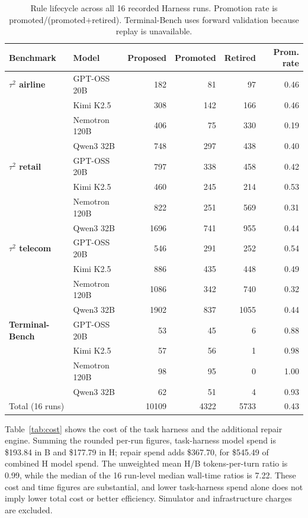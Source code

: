 \documentclass[11pt,letterpaper]{article}
\begin{document}
\begin{table}[H]
\centering\small
\setlength{\tabcolsep}{3pt}
\caption{Rule lifecycle across all 16 recorded Harness runs.
Promotion rate is promoted/(promoted$+$retired). Terminal-Bench uses
forward validation because replay is unavailable.}
\label{tab:lifecycle}
\begin{tabular*}{\linewidth}{@{\extracolsep{\fill}}llrrrr@{}}
\toprule
Benchmark & Model & Proposed & Promoted & Retired & Prom. rate \\
\midrule
\textbf{$\tau^2$ airline} & GPT-OSS 20B & 182 & 81 & 97 & 0.46 \\
 & Kimi K2.5 & 308 & 142 & 166 & 0.46 \\
 & Nemotron 120B & 406 & 75 & 330 & 0.19 \\
 & Qwen3 32B & 748 & 297 & 438 & 0.40 \\
\midrule
\textbf{$\tau^2$ retail} & GPT-OSS 20B & 797 & 338 & 458 & 0.42 \\
 & Kimi K2.5 & 460 & 245 & 214 & 0.53 \\
 & Nemotron 120B & 822 & 251 & 569 & 0.31 \\
 & Qwen3 32B & 1696 & 741 & 955 & 0.44 \\
\midrule
\textbf{$\tau^2$ telecom} & GPT-OSS 20B & 546 & 291 & 252 & 0.54 \\
 & Kimi K2.5 & 886 & 435 & 448 & 0.49 \\
 & Nemotron 120B & 1086 & 342 & 740 & 0.32 \\
 & Qwen3 32B & 1902 & 837 & 1055 & 0.44 \\
\midrule
\textbf{Terminal-Bench} & GPT-OSS 20B & 53 & 45 & 6 & 0.88 \\
 & Kimi K2.5 & 57 & 56 & 1 & 0.98 \\
 & Nemotron 120B & 98 & 95 & 0 & 1.00 \\
 & Qwen3 32B & 62 & 51 & 4 & 0.93 \\
\midrule
Total (16 runs) & & 10109 & 4322 & 5733 & 0.43 \\
\bottomrule
\end{tabular*}
\end{table}

Table~\ref{tab:cost} shows the cost of the task harness and the
additional repair engine. Summing the rounded per-run figures, task-harness
model spend is \$193.84 in B and \$177.79 in H; repair spend adds
\$367.70, for \$545.49 of combined H model spend. The unweighted mean
H/B tokens-per-turn ratio is 0.99, while the median of the 16
run-level median wall-time ratios is 7.22. These cost and time figures
are substantial, and lower task-harness spend alone does not imply
lower total cost or better efficiency. Simulator and infrastructure
charges are excluded.
\end{document}
